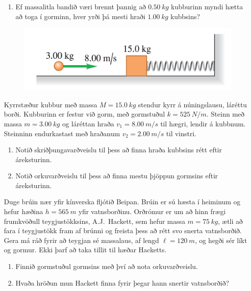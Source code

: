 \begin{enumerate}[label = \textbf{Dæmi \thechapter.\arabic*.}]
\begin{minipage}{\linewidth}
\begin{enumerate}[label = \textbf{(\alph*)}]
    \item Ef massalitla bandið væri brennt þannig að $\SI{0.50}{kg}$ kubburinn myndi hætta að toga í gorminn, hver yrði þá mesti hraði $\SI{1.00}{kg}$ kubbsins?
\end{enumerate}

\end{minipage}

\begin{minipage}{\linewidth}
\begin{figure}
\vspace{-0.75cm}
\includegraphics[scale=0.25]{temp/prob.png}
\end{figure}

\item Kyrrstæður kubbur með massa $M = \SI{15.0}{kg}$ stendur kyrr á núningslausu, láréttu borði. Kubburinn er festur við gorm, með gormstuðul $k = \SI{525}{N/m}$. Steinn með massa $m = \SI{3.00}{kg}$ og láréttan hraða $v_1 = \SI{8.00}{m/s}$ til hægri, lendir á kubbnum. Steinninn endurkastast með hraðanum $v_2 = \SI{2.00}{m/s}$ til vinstri.
\end{minipage}

\begin{enumerate}[label = \textbf{(\alph*)}]
    \item Notið skriðþungavarðveislu til þess að finna hraða kubbsins rétt eftir áreksturinn.
    \item Notið orkuvarðveislu til þess að finna mestu þjöppun gormsins eftir áreksturinn.
\end{enumerate}


\item Duge brúin nær yfir kínverska fljótið Beipan. Brúin er sú hæsta í heiminum og hefur hæðina $ h = \SI{565}{m}$ yfir vatnsborðinu. Orðrómur er um að hinn frægi frumkvöðull teygjustökksins, A.J.~Hackett, sem hefur massa $m = \SI{75}{kg}$, ætli að fara í teygjustökk fram af brúnni og freista þess að rétt svo snerta vatnsborðið. Gera má ráð fyrir að teygjan sé massalaus, af lengd $\ell = \SI{120}{m}$, og hegði sér líkt og gormur. Ekki þarf að taka tillit til hæðar Hacketts.
\begin{enumerate}[label = \textbf{(\alph*)}]
    \item Finnið gormstuðul gormsins með því að nota orkuvarðveislu.
    
    \item Hvaða hröðun mun Hackett finna fyrir þegar hann snertir vatnsborðið?
\end{enumerate}

\end{enumerate}


